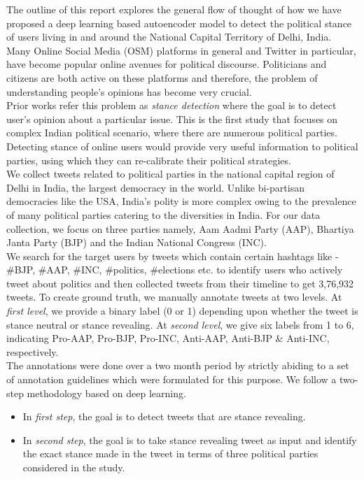 \documentclass[a4paper,11pt]{article}
\begin{document}

The outline of this report explores the general flow of thought of how we have proposed a deep learning based autoencoder model to detect the political stance of users living in and around the National Capital Territory of Delhi, India. \medskip\\
Many Online Social Media (OSM) platforms in general and Twitter in particular, have become popular online avenues for political discourse. Politicians and citizens are both active on these platforms and therefore, the problem of understanding people's opinions has become very crucial. \medskip\\
Prior works \cite{lai2016friends,johnson2016identifying} refer this problem as \textit{stance detection} where the goal is to detect user's opinion about a particular issue. This is the first study that focuses on complex Indian political scenario, where there are numerous political parties. Detecting stance of online users would provide very useful information to political parties, using which they can re-calibrate their political strategies.\medskip\\
We collect tweets related to political parties in the national capital region of Delhi in India, the largest democracy in the world. Unlike bi-partisan democracies like the USA, India's polity is more complex owing to the prevalence of many political parties catering to the diversities in India. For our data collection, we focus on three parties namely, Aam Aadmi Party (AAP), Bhartiya Janta Party (BJP) and the Indian National Congress (INC).\medskip\\
We search for the target users by tweets which contain certain hashtags like - \#BJP, \#AAP, \#INC, \#politics, \#elections  etc. to identify users who actively tweet about politics and then collected tweets from their timeline to get 3,76,932 tweets. To create ground truth, we manually annotate tweets at two levels. At \textit{first level}, we provide a binary label (0 or 1) depending upon whether the tweet is stance neutral or stance revealing. At \textit{second level}, we give six labels from 1 to 6, indicating Pro-AAP, Pro-BJP, Pro-INC, Anti-AAP, Anti-BJP \& Anti-INC, respectively.\medskip\\
The annotations were done over a two month period by strictly abiding to a set of annotation guidelines which were formulated for this purpose. We follow a two-step methodology based on deep learning. 
\begin{itemize}
    \item In \textit{first step}, the goal is to detect tweets that are stance revealing. 
    \item In \textit{second step}, the goal is to take stance revealing tweet as input and identify the exact stance made in the tweet in terms of three political parties considered in the study. 
\end{itemize}
\end{document}

